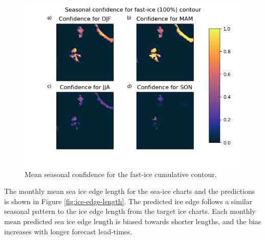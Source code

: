 \documentclass[../main/thesis.tex]{subfiles}
\begin{document}
\begin{figure}
    \centering
    \includegraphics[width=\textwidth]{confidence_test_contour_6}
    \caption{\label{fig:confidence_seasonal}Mean seasonal confidence for the fast-ice cumulative contour.}
\end{figure}

The monthly mean sea ice edge length for the sea-ice charts and the predictions is shown in Figure \ref{fig:ice-edge-length}. The predicted ice edge follows a similar seasonal pattern to the ice edge length from the target ice charts. Each monthly mean predicted sea ice edge length is biased towards shorter lengths, and the bias increases with longer forecast lead-times.
\end{document}
